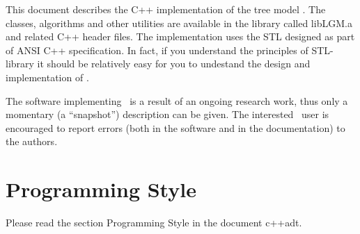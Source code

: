 This document  describes   the C++  implementation of the   tree model
\linebreak \lignum.  The  classes, algorithms and  other utilities are
available in the library called libLGM.a and related C++ header files.
The  implementation uses   the STL  designed   as  part  of  ANSI  C++
specification. In fact, if you understand  the principles of STL-library
it  should  be relatively  easy for you  to  undestand  the design and
implementation of \lignum.

The software implementing \lignum\ is a result  of an ongoing research
work,  thus only  a   momentary  (a ``snapshot'') description   can be
given. The interested  \lignum\ user  is  encouraged to  report errors
(both in the software and in the documentation) to the authors.


\chapter{Programming Style}
Please read the section Programming Style in the document c++adt.

